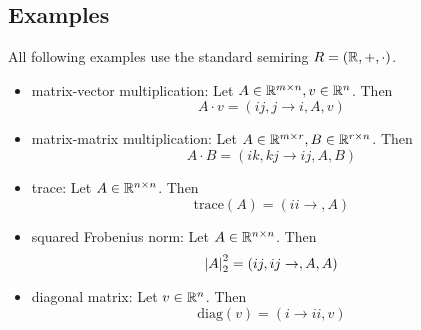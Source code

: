 \subsection{Examples}
All following examples use the standard semiring $R = (\mathbb{R}, +, \cdot)$.
\begin{itemize}
    \item matrix-vector multiplication: Let $A \in \mathbb{R}^{m \times n}, v \in \mathbb{R}^{n}$. Then
          $$A \cdot v = (ij, j \rightarrow i, A, v)$$
    \item matrix-matrix multiplication: Let $A \in \mathbb{R}^{m \times r}, B \in \mathbb{R}^{r \times n}$. Then
          $$A \cdot B = (ik, kj \rightarrow ij, A, B)$$
    \item trace: Let $A \in \mathbb{R}^{n \times n}$. Then
          $$\text{trace}(A) = (ii \rightarrow, A)$$
    \item squared Frobenius norm: Let $A \in \mathbb{R}^{n \times n}$. Then
          $$\left| A \right|_2^2 = (ij, ij \rightarrow,A,A)$$
    \item diagonal matrix: Let $v \in \mathbb{R}^{n}$. Then
          $$\text{diag}(v) = (i \rightarrow ii, v)$$
\end{itemize}

